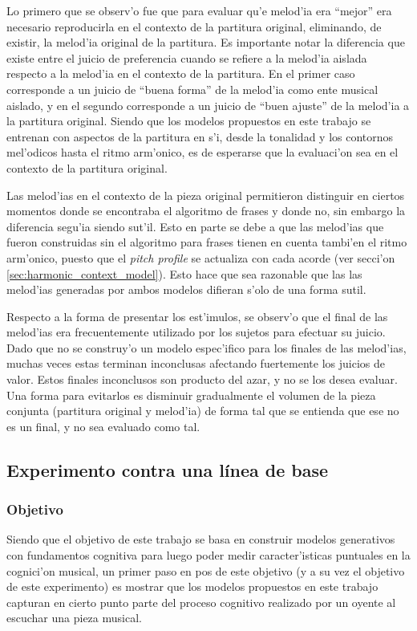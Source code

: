 Lo primero que se observ'o fue que para evaluar qu'e melod'ia era ``mejor'' era necesario reproducirla en el contexto de la partitura original, eliminando, de existir, la melod'ia original de la partitura. Es importante notar la diferencia que existe entre el juicio de preferencia cuando se refiere
a la melod'ia aislada respecto a la melod'ia en el contexto de la partitura. En el primer caso corresponde a un juicio de ``buena forma'' de la 
melod'ia como ente musical aislado, y en el segundo corresponde a un juicio de ``buen ajuste'' de la melod'ia a la partitura original. Siendo que 
los modelos propuestos en este trabajo se entrenan con aspectos de la partitura en s'i, desde la tonalidad y los contornos mel'odicos hasta el ritmo
arm'onico, es de esperarse que la evaluaci'on sea en el contexto de la partitura original.

Las melod'ias en el contexto de la pieza original permitieron distinguir en ciertos momentos donde se encontraba el algoritmo de frases y donde no,
sin embargo la diferencia segu'ia siendo sut'il. Esto en parte se debe a que las melod'ias que fueron construidas sin el algoritmo para frases
tienen en cuenta tambi'en el ritmo arm'onico, puesto que el \emph{pitch profile} se actualiza con cada acorde (ver secci'on \ref{sec:harmonic_context_model}).
Esto hace que sea razonable que las las melod'ias generadas por ambos modelos difieran s'olo de una forma sutil.

Respecto a la forma de presentar los est'imulos, se observ'o que el final de las melod'ias era frecuentemente utilizado por los sujetos para
efectuar su juicio. Dado que no se construy'o un modelo espec'ifico para los finales de las melod'ias, muchas veces estas terminan inconclusas afectando fuertemente los juicios de valor.
Estos finales inconclusos son producto del azar, y no se los desea evaluar. Una forma para evitarlos es disminuir gradualmente el volumen de la pieza conjunta
(partitura original y melod'ia) de forma tal que se entienda que ese no es un final, y no sea evaluado como tal.


\subsection{Experimento contra una l\'inea de base}
\label{sec:exp_baseline}
\subsubsection{Objetivo}
Siendo que el objetivo de este trabajo se basa en construir modelos generativos con fundamentos cognitiva para luego poder medir caracter'isticas puntuales
en la cognici'on musical, un primer paso en pos de este objetivo (y a su vez el objetivo de este experimento) es mostrar que los modelos propuestos 
en este trabajo capturan en cierto punto parte del proceso cognitivo realizado por un oyente al escuchar una pieza musical. 

